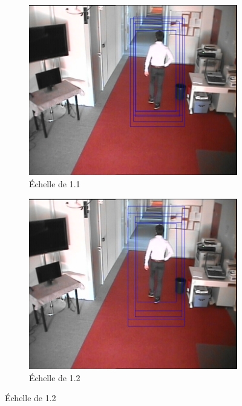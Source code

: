 \documentclass[12pt]{article}
\begin{document}
\begin{figure}[!ht]
	\centering
	\begin{subfigure}{.3\textwidth}
		\centering
		\includegraphics[clip=true,trim=300 100 150 0,width=\linewidth]{img/multiscale11.png}
		\caption{Échelle de 1.1}
	\end{subfigure}
	\begin{subfigure}{.3\textwidth}
		\centering
		\includegraphics[clip=true,trim=300 100 150 0,width=\linewidth]{img/multiscale12.png}
		\caption{Échelle de 1.2}
	\end{subfigure}

\end{figure}
\end{document}

